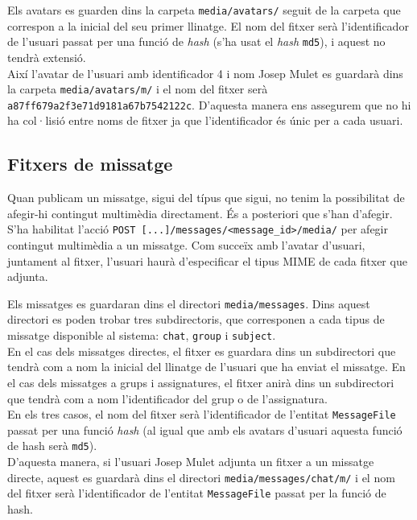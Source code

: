 Els avatars es guarden dins la carpeta \texttt{media/avatars/} seguit de la carpeta que correspon a la inicial del seu primer llinatge. El nom del fitxer serà l'identificador de l'usuari passat per una funció de \emph{hash} (s'ha usat el \emph{hash} \texttt{md5}), i aquest no tendrà extensió. \\

Així l'avatar de l'usuari amb identificador 4 i nom Josep Mulet es guardarà dins la carpeta \texttt{media/avatars/m/} i el nom del fitxer serà \texttt{a87ff679a2f3e71d9181a67b7542122c}. D'aquesta manera ens assegurem que no hi ha col·lisió entre noms de fitxer ja que l'identificador és únic per a cada usuari.

\subsection{Fitxers de missatge}

Quan publicam un missatge, sigui del típus que sigui, no tenim la possibilitat de afegir-hi contingut multimèdia directament. És a posteriori que s'han d'afegir. S'ha habilitat l'acció \verb$POST [...]/messages/<message_id>/media/$ per afegir contingut multimèdia a un missatge. Com succeïx amb l'avatar d'usuari, juntament al fitxer, l'usuari haurà d'especificar el tipus \ac{MIME} de cada fitxer que adjunta.

Els missatges es guardaran dins el directori \texttt{media/messages}. Dins aquest directori es poden trobar tres subdirectoris, que corresponen a cada tipus de missatge disponible al sistema: \texttt{chat}, \texttt{group} i \texttt{subject}.\\

En el cas dels missatges directes, el fitxer es guardara dins un subdirectori que tendrà com a nom la inicial del llinatge de l'usuari que ha enviat el missatge. En el cas dels missatges a grups i assignatures, el fitxer anirà dins un subdirectori que tendrà com a nom l'identificador del grup o de l'assignatura. \\

En els tres casos, el nom del fitxer serà l'identificador de l'entitat \texttt{MessageFile} passat per una funció \emph{hash} (al igual que amb els avatars d'usuari aquesta funció de hash serà \texttt{md5}).\\

D'aquesta manera, si l'usuari Josep Mulet adjunta un fitxer a un missatge directe, aquest es guardarà dins el directori \texttt{media/messages/chat/m/} i el nom del fitxer serà l'identificador de l'entitat \texttt{MessageFile} passat per la funció de hash.

